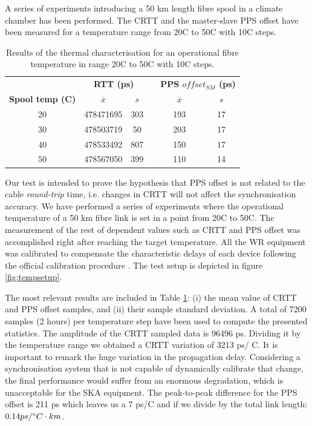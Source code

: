 A series of experiments introducing a 50 km length fibre spool in a climate chamber has been performed.
The CRTT and the master-slave PPS offset have 
been measured for a temperature range from 20\degree C to 50\degree C with 10\degree C steps. 

\begin{table}\centering
	\begin{tabular}{@{} cccccc@{}}%
		& \multicolumn{2}{c}{\bfseries{RTT (ps)}} & &
		\multicolumn{2}{c}{\bfseries{PPS $offset_{SM}$ (ps)}} \\
		\cmidrule(l){2-3}  \cmidrule{5-6}
		\textbf{Spool temp (\degree C)} & $\overline{x}$ & $s$ & & $\overline{x}$ 
		& $s$ \\ \midrule
		\small{20} & 478471695 & 303 & & 193 & 17 \\
		\small{30} & 478503719 & 50  & & 203 & 17 \\
		\small{40} & 478533492 & 807 & & 150 & 17 \\
		\small{50} & 478567050 & 399 & & 110 & 14 \\
		\bottomrule
	\end{tabular}
	\caption{Results of the thermal characterisation for an operational fibre 
		temperature in range 20\degree C to 50\degree C with 10\degree C steps.}
	\label{tab:temp}
\end{table}

Our test is intended to prove the hypothesis that PPS offset is not related to 
the cable \textit{round-trip} time, i.e. changes in CRTT will not affect the 
synchronisation accuracy. We have performed a series of experiments where the 
operational temperature of a 50 km fibre link is set in a point from 20\degree C to 
50\degree C. The measurement of the rest of dependent values such as CRTT and PPS offset
was accomplished right after reaching the target temperature.
All the WR equipment was 
calibrated to compensate the characteristic delays of each device 
following the official calibration procedure \cite{man:calib}.  The test setup 
is depicted in figure \ref{fig:tempsetup}.

The most relevant results are included in Table \ref{tab:temp}: (i) the mean 
value of CRTT and PPS offset samples, and (ii) their sample standard deviation. 
A total of 7200 samples (2 hours) per temperature step have been used to 
compute the presented statistics. The amplitude of the CRTT sampled data is 
96496 ps. Dividing it by the temperature range we obtained a CRTT variation of 
3213 ps/ \degree C. It is important to remark the huge variation in the propagation delay. 
Considering a synchronisation system that is not capable of dynamically 
calibrate that change, the final performance would suffer from an enormous 
degradation, which is unacceptable for the SKA equipment. The peak-to-peak 
difference for the PPS offset is 211 ps which leaves us a 7 ps/\degree C and if we 
divide by the total link length: $0.14 ps/\degree C \cdot km$.

